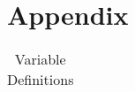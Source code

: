 \clearpage 






\clearpage
\section{Appendix}
\setcounter{table}{0}
\renewcommand{\thetable}{A\arabic{table}}






\begin{table}[htbp]
	\scriptsize
	\caption{Variable Definitions}
	\label{tab:n2a_impact:vardef}
	\bgroup
	\def\arraystretch{1.3}
    \begin{tabular}{p{}p{}}
    \toprule
	

\end{tabular}
\end{table}
